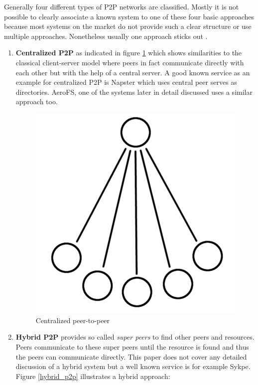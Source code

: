 Generally four different types of P2P networks are classified. Mostly it is not possible to clearly associate a known system to one of these four basic approaches because most systems on the market do not provide such a clear structure or use multiple approaches. Nonetheless usually one approach sticks out \cite{ptp-introduction:tomptp}.
\begin{enumerate}
	\item \textbf{Centralized P2P} as indicated in figure \ref{centralized_p2p} which shows similarities to the classical client-server model where peers in fact communicate directly with each other but with the help of a central server. A good known service as an example for centralized P2P is Napster which uses central peer serves as directories. AeroFS, one of the systems later in detail discussed uses a similar approach too.
	\begin{figure}[H]
		\begin{center}
		\includegraphics[scale=0.2]{Talk5/centralized_p2p.PNG}
		\end{center}
		\caption{Centralized peer-to-peer}
		\label{centralized_p2p}
	\end{figure}
	\item \textbf{Hybrid P2P} provides so called \textit{super peers} to find other peers and resources. Peers communicate to these super peers until the resource is found and thus the peers can communicate directly. This paper does not cover any detailed discussion of a hybrid system but a well known service is for example Sykpe. Figure \ref{hybrid_p2p} illustrates a hybrid approach:

\end{enumerate}
